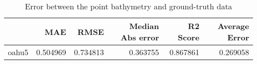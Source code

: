 \begin{table}[h!]
\centering
\caption{Error between the point bathymetry and ground-truth data}
\label{tab:oahu5_lidar_error}
\begin{tabular}{lrrrrr}
\toprule
 & MAE & RMSE & Median Abs error & R2 Score & Average Error \\
\midrule
oahu5 & 0.504969 & 0.734813 & 0.363755 & 0.867861 & 0.269058 \\
\bottomrule
\end{tabular}
\end{table}
